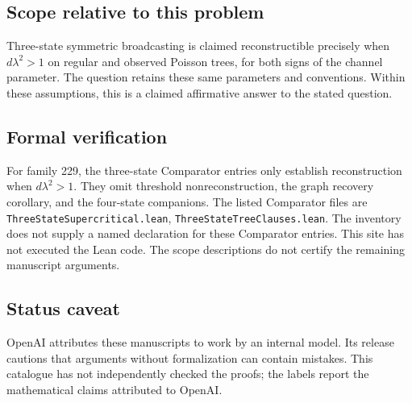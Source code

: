 \documentclass[11pt]{article}
\begin{document}
\subsection{Scope relative to this problem}
Three-state symmetric broadcasting is claimed reconstructible precisely when $d\lambda^2>1$ on regular and observed Poisson trees, for both signs of the channel parameter. The question retains these same parameters and conventions. Within these assumptions, this is a claimed affirmative answer to the stated question.

\subsection{Formal verification}
For family 229, the three-state Comparator entries only establish reconstruction when $d\lambda^2>1$. They omit threshold nonreconstruction, the graph recovery corollary, and the four-state companions. The listed Comparator files are \texttt{ThreeStateSupercritical.lean}, \texttt{ThreeStateTreeClauses.lean}. The inventory does not supply a named declaration for these Comparator entries. This site has not executed the Lean code. The scope descriptions do not certify the remaining manuscript arguments.

\subsection{Status caveat}
OpenAI attributes these manuscripts to work by an internal model. Its release cautions that arguments without formalization can contain mistakes. This catalogue has not independently checked the proofs; the labels report the mathematical claims attributed to OpenAI.
\end{document}

